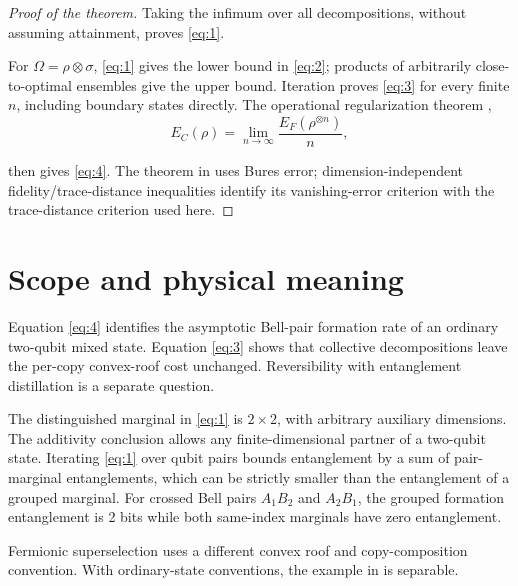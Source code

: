 \documentclass[10pt,letterpaper]{article}
\begin{document}
\begin{proof}[Proof of the theorem]
Taking the infimum over all decompositions, without assuming attainment, proves \eqref{eq:1}.

For \(\Omega=\rho\otimes\sigma\), \eqref{eq:1} gives the lower bound in \eqref{eq:2}; products of arbitrarily close-to-optimal ensembles give the upper bound. Iteration proves \eqref{eq:3} for every finite \(n\), including boundary states directly. The operational regularization theorem \cite{ref3},
\begin{equation*}
E_C(\rho)=\lim_{n\to\infty}\frac{E_F(\rho^{\otimes n})}{n},
\end{equation*}

then gives \eqref{eq:4}. The theorem in \cite{ref3} uses Bures error; dimension-independent fidelity/trace-distance inequalities identify its vanishing-error criterion with the trace-distance criterion used here.  \end{proof}

\section{Scope and physical meaning}

Equation \eqref{eq:4} identifies the asymptotic Bell-pair formation rate of an ordinary two-qubit mixed state. Equation \eqref{eq:3} shows that collective decompositions leave the per-copy convex-roof cost unchanged. Reversibility with entanglement distillation is a separate question.

The distinguished marginal in \eqref{eq:1} is \(2\times2\), with arbitrary auxiliary dimensions. The additivity conclusion allows any finite-dimensional partner of a two-qubit state. Iterating \eqref{eq:1} over qubit pairs bounds entanglement by a sum of pair-marginal entanglements, which can be strictly smaller than the entanglement of a grouped marginal. For crossed Bell pairs \(A_1B_2\) and \(A_2B_1\), the grouped formation entanglement is 2 bits while both same-index marginals have zero entanglement.

Fermionic superselection uses a different convex roof and copy-composition convention. With ordinary-state conventions, the example in \cite[Eq.~III.28]{ref7} is separable.
\end{document}
